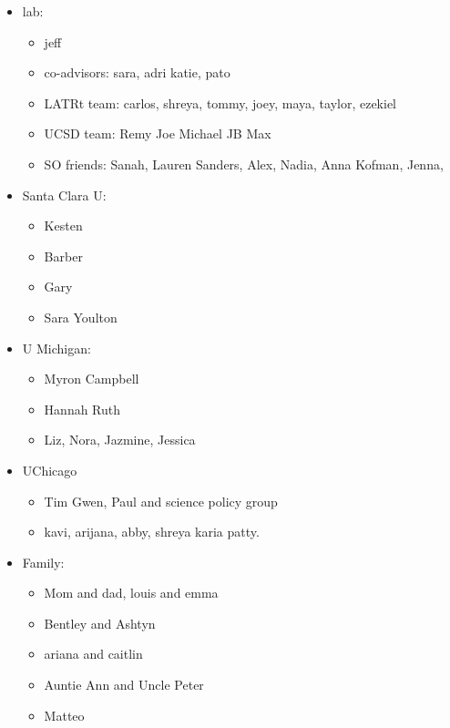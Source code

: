 \documentclass{ucetd}
\begin{document}
\begin{itemize}

\item lab: \begin{itemize}
        \item jeff
        \item co-advisors: sara, adri katie, pato
        \item LATRt team: carlos, shreya, tommy, joey, maya, taylor, ezekiel
        \item UCSD team: Remy Joe Michael JB Max
        \item SO friends: Sanah, Lauren Sanders, Alex, Nadia, Anna Kofman, Jenna,
    \end{itemize}
    \item Santa Clara U: \begin{itemize}
        \item Kesten
        \item Barber
        \item Gary
        \item Sara Youlton
    \end{itemize}
    \item U Michigan: \begin{itemize}
        \item Myron Campbell
        \item Hannah Ruth
        \item Liz, Nora, Jazmine, Jessica
    \end{itemize}
    
    \item UChicago\begin{itemize}
        \item Tim Gwen, Paul and science policy group
        \item kavi, arijana, abby, shreya karia patty.
    \end{itemize}
    \item Family: \begin{itemize}
        \item Mom and dad, louis and emma
        \item Bentley and Ashtyn
        \item ariana and caitlin
        \item Auntie Ann and Uncle Peter
        \item Matteo
    \end{itemize}

\end{itemize}
\end{document}

